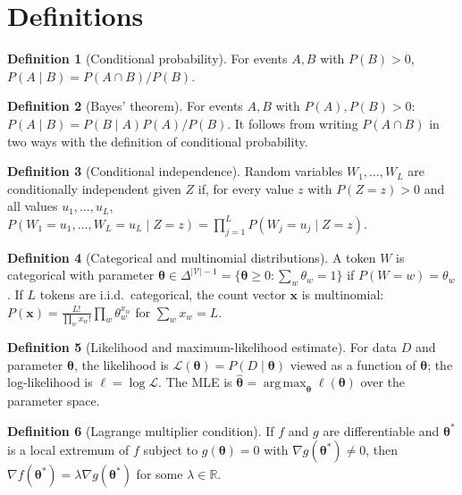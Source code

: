 \documentclass[11pt]{article}
\theoremstyle{plain}
\theoremstyle{definition}
\newtheorem{definition}{Definition}
\newcommand{\R}{\mathbb{R}}
\newcommand{\Vs}{|\mathcal{V}|}
\newcommand{\bx}{\mathbf{x}}
\DeclareMathOperator*{\argmax}{arg\,max}
\begin{document}
\section{Definitions}\label{sec:definitions}

\begin{definition}[Conditional probability]
For events $A,B$ with $P(B)>0$, $P(A\mid B)=P(A\cap B)/P(B)$.
\end{definition}

\begin{definition}[Bayes' theorem]
For events $A,B$ with $P(A),P(B)>0$: $P(A\mid B)=P(B\mid A)P(A)/P(B)$. It follows from writing
$P(A\cap B)$ in two ways with the definition of conditional probability.
\end{definition}

\begin{definition}[Conditional independence]
Random variables $W_1,\dots,W_L$ are conditionally independent given $Z$ if, for every value $z$
with $P(Z=z)>0$ and all values $u_1,\dots,u_L$,
$P(W_1=u_1,\dots,W_L=u_L\mid Z=z)=\prod_{j=1}^L P(W_j=u_j\mid Z=z)$.
\end{definition}

\begin{definition}[Categorical and multinomial distributions]
A token $W$ is categorical with parameter $\boldsymbol\theta\in\Delta^{\Vs-1}
=\{\boldsymbol\theta\ge 0:\sum_w\theta_w=1\}$ if $P(W=w)=\theta_w$. If $L$ tokens are
i.i.d.\ categorical, the count vector $\bx$ is multinomial:
$P(\bx)=\frac{L!}{\prod_w x_w!}\prod_w \theta_w^{x_w}$ for $\sum_w x_w=L$.
\end{definition}

\begin{definition}[Likelihood and maximum-likelihood estimate]
For data $D$ and parameter $\boldsymbol\theta$, the likelihood is
$\mathcal L(\boldsymbol\theta)=P(D\mid\boldsymbol\theta)$ viewed as a function of
$\boldsymbol\theta$; the log-likelihood is $\ell=\log\mathcal L$. The MLE is
$\hat{\boldsymbol\theta}=\argmax_{\boldsymbol\theta}\ell(\boldsymbol\theta)$ over the parameter space.
\end{definition}

\begin{definition}[Lagrange multiplier condition]
If $f$ and $g$ are differentiable and $\boldsymbol\theta^*$ is a local extremum of $f$ subject
to $g(\boldsymbol\theta)=0$ with $\nabla g(\boldsymbol\theta^*)\ne 0$, then
$\nabla f(\boldsymbol\theta^*)=\lambda\nabla g(\boldsymbol\theta^*)$ for some $\lambda\in\R$.
\end{definition}
\end{document}
